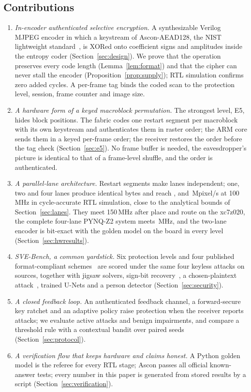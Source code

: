 \subsection{Contributions}
\begin{enumerate}
\item \textit{In-encoder authenticated selective encryption.} A synthesizable Verilog MJPEG encoder in which a keystream of Ascon-AEAD128, the NIST lightweight standard~\cite{sp800232,ascon}, is XORed onto coefficient signs and amplitudes inside the entropy coder (Section~\ref{sec:design}). We prove that the operation preserves every code length (Lemma~\ref{lem:format}) and that the cipher can never stall the encoder (Proposition~\ref{prop:supply}); RTL simulation confirms zero added cycles. A per-frame tag binds the coded scan to the protection level, session, frame counter and image size.
\item \textit{A hardware form of a keyed macroblock permutation.} The strongest level, E5, hides block positions. The fabric codes one restart segment per macroblock with its own keystream and authenticates them in raster order; the ARM core sends them in a keyed per-frame order; the receiver restores the order before the tag check (Section~\ref{sec:e5}). No frame buffer is needed, the eavesdropper's picture is identical to that of a frame-level shuffle, and the order is authenticated.
\item \textit{A parallel-lane architecture.} Restart segments make lanes independent; one, two and four lanes produce identical bytes and reach \RtlOneLaneMpix, \RtlTwoLanesMpix{} and \RtlFourLanesMpix\,Mpixel/s at 100\,MHz in cycle-accurate RTL simulation, close to the analytical bounds of Section~\ref{sec:lanes}. They meet 150\,MHz after place and route on the xc7z020, the complete four-lane PYNQ-Z2 system meets \OverlayLanesFourMhz\,MHz, and the two-lane encoder is bit-exact with the golden model on the board in every level (Section~\ref{sec:hwresults}).
\item \textit{SVE-Bench, a common yardstick.} Six protection levels and four published format-compliant schemes~\cite{vandroogenbroeck2002,kishore2015,auer2013,hirose2024} are scored under the same four keyless attacks on \BenchSources{} sources, together with jigsaw solvers, sign-bit recovery~\cite{lin2024}, a chosen-plaintext attack~\cite{li2025shuffle}, trained U-Nets and a person detector (Section~\ref{sec:security}).
\item \textit{A closed feedback loop.} An authenticated feedback channel, a forward-secure key ratchet and an adaptive policy raise protection when the receiver reports attacks; we evaluate \NumAttacks{} active attacks and benign impairments, and compare a threshold rule with a contextual bandit over \Seeds{} paired seeds (Section~\ref{sec:protocol}).
\item \textit{A verification flow that keeps hardware and claims honest.} A Python golden model is the referee for every RTL stage; Ascon passes all official known-answer tests; every number in this paper is generated from stored results by a script (Section~\ref{sec:verification}).
\end{enumerate}

